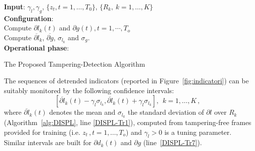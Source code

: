 \documentclass{llncs}
\begin{document}
\begin{algorithm}[t]
	\LinesNumbered
	\textbf{Input}: $\gamma_l, \gamma_g$, $\{z_t, t = 1, \dots, T_{0}\}$, $\{R_k, \ k=1,\dots,K\}$ \\
	\textbf{Configuration}:\\
	 Compute $\partial l_k(t)$ and $\partial g(t), t = 1, \cdots, T_o$\\ 
	 Compute $\overline{\partial l}_k$, $\overline{\partial g}$, $\sigma_{l_k}$ and $\sigma_{g}$.\\
	
	\textbf{Operational phase}:\\
	    
	\caption{The Proposed Tampering-Detection Algorithm}
	\label{alg:DISPL}
\end{algorithm}

The sequences of detrended indicators (reported in Figure~\ref{fig:indicatori}) can be suitably monitored by the following confidence intervals:
\begin{equation}\label{eq:confidenceRegions}
 [\overline{\partial l}_k(t) - \gamma_l \sigma_{l_k}, \overline{\partial l}_k(t) + \gamma_l \sigma_{l_k}], \ \  k = 1,\dots,K\,,
\end{equation}
where $\overline{\partial l}_k(t)$ denotes the mean and $\sigma_{l_k}$ the standard deviation of $\partial l$ over $R_k$ (Algorithm~\ref{alg:DISPL}, line \ref{DISPL-Tr1}), computed from tampering-free frames provided for training (i.e. $z_t\,, t = 1, \dots, T_o$) and $\gamma_l >0$ is a tuning parameter. Similar intervals are built for  $\partial d_k(t)$ and $\partial g$ (line~\ref{DISPL-Tr7}). 
\end{document}
